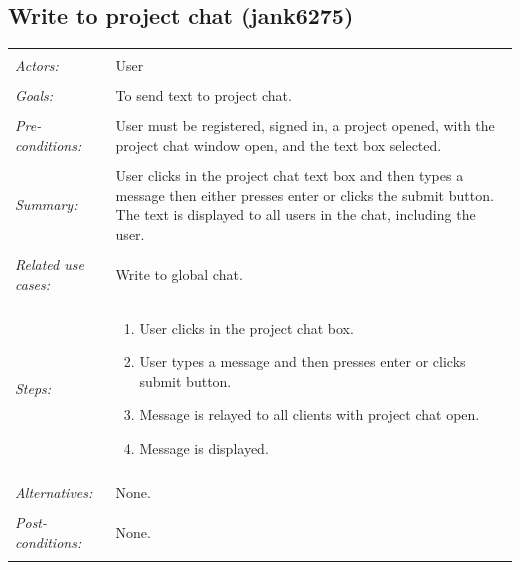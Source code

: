 \documentclass[11pt]{report}
\begin{document}
\begin{IDE-like Features}
\begin{}
\begin{Collaborative features that would be "nice":}
\subsection{Write to project chat (jank6275)}
\begin{tabular}{ p{2cm} p{12cm} }
 \hline
 \\
 \textit{Actors:} & User \\ 
 \\
 \textit{Goals:} & To send text to project chat. \\
 \\
 \textit{Pre-conditions:} & User must be registered, signed in, a project opened, with the project chat window open, and the text box selected.  \\
 \\
 \textit{Summary:} & User clicks in the project chat text box and then types a message then either presses enter or clicks the submit button. The text is displayed to all users in the chat, including the user. \\ 
 \\
 \textit{Related use cases:} & Write to global chat. \\ 
 \\
 \textit{Steps:} & \begin{enumerate}
  \item User clicks in the project chat box.
  \item User types a message and then presses enter or clicks submit button.
  \item Message is relayed to all clients with project chat open.
  \item Message is displayed.
 \end{enumerate} \\
 \\
 \textit{Alternatives:} & None. \\
 \\
 \textit{Post-conditions:} & None. \\
 \\
\hline
\end{tabular}


\end{Collaborative features that would be "nice":}
\end{}
\end{IDE-like Features}
\end{document}
